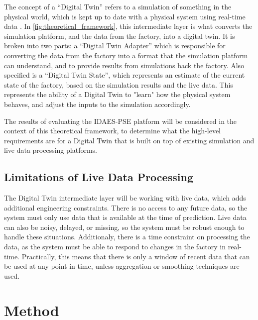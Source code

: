 \documentclass[12pt]{article}
\begin{document}
The concept of a “Digital Twin” refers to a simulation of something in the physical world, which is kept up to date with a physical system using real-time data \cite{yu2022energy}.
In \cref{fig:theoretical_framework}, this intermediate layer is what converts the simulation platform, and the data from the factory, into a digital twin. It is broken into two parts: a ``Digital Twin Adapter'' which is responsible for converting the data from the factory into a format that the simulation platform can understand, and to provide results from simulations back the factory. Also specified is a ``Digital Twin State'', which represents an estimate of the current state of the factory, based on the simulation results and the live data. This represents the ability of a Digital Twin to "learn" how the physical system behaves, and adjust the inputs to the simulation accordingly.

The results of evaluating the IDAES-PSE platform will be considered in the context of this theoretical framework, to determine what the high-level requirements are for a Digital Twin that is built on top of existing simulation and live data processing platforms.

\subsection{Limitations of Live Data Processing} \label{sec:limitations_framework}


The Digital Twin intermediate layer will be working with live data, which adds additional engineering constraints. There is no access to any future data, so the system must only use data that is available at the time of prediction. Live data can also be noisy, delayed, or missing, so the system must be robust enough to handle these situations. Additionaly, there is a time constraint on processing the data, as the system must be able to respond to changes in the factory in real-time. Practically, this means that there is only a window of recent data that can be used at any point in time, unless aggregation or smoothing techniques are used.

\section{Method}
\end{document}
